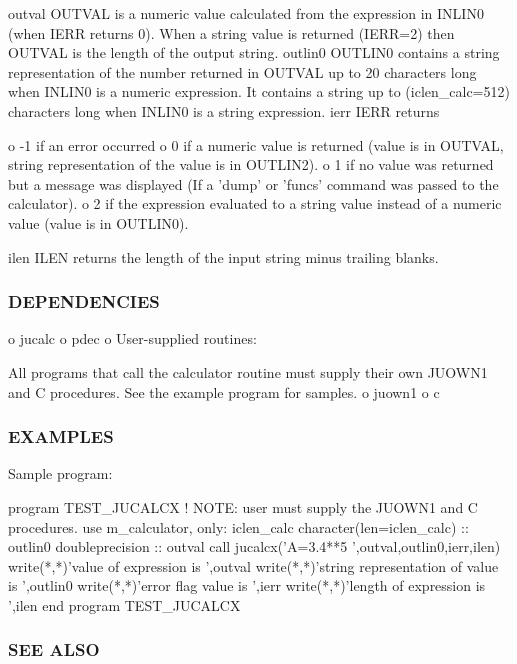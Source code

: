 outval O\+U\+T\+V\+AL is a numeric value calculated from the expression in I\+N\+L\+I\+N0 (when I\+E\+RR returns 0). When a string value is returned (I\+E\+RR=2) then O\+U\+T\+V\+AL is the length of the output string. outlin0 O\+U\+T\+L\+I\+N0 contains a string representation of the number returned in O\+U\+T\+V\+AL up to 20 characters long when I\+N\+L\+I\+N0 is a numeric expression. It contains a string up to (iclen\+\_\+calc=512) characters long when I\+N\+L\+I\+N0 is a string expression. ierr I\+E\+RR returns \begin{DoxyVerb}    o -1 if an error occurred
    o 0 if a numeric value is returned (value is in OUTVAL, string
      representation of the value is in OUTLIN2).
    o 1 if no value was returned but a message was displayed (If a 'dump'
      or 'funcs' command was passed to the calculator).
    o 2 if the expression evaluated to a string value instead of a
      numeric value (value is in OUTLIN0).
\end{DoxyVerb}
 ilen I\+L\+EN returns the length of the input string minus trailing blanks.

\subsubsection*{D\+E\+P\+E\+N\+D\+E\+N\+C\+I\+ES}

o jucalc o pdec o User-\/supplied routines\+:

All programs that call the calculator routine must supply their own J\+U\+O\+W\+N1 and C procedures. See the example program for samples. o juown1 o c \subsubsection*{E\+X\+A\+M\+P\+L\+ES}

\begin{DoxyVerb}Sample program:

 program TEST_JUCALCX
 !     NOTE: user must supply the JUOWN1 and C procedures.
 use m_calculator, only: iclen_calc
 character(len=iclen_calc) ::  outlin0
 doubleprecision :: outval
 call jucalcx('A=3.4**5    ',outval,outlin0,ierr,ilen)
 write(*,*)'value of expression is ',outval
 write(*,*)'string representation of value is ',outlin0
 write(*,*)'error flag value is ',ierr
 write(*,*)'length of expression is ',ilen
 end program TEST_JUCALCX
\end{DoxyVerb}


\subsubsection*{S\+EE A\+L\+SO}

